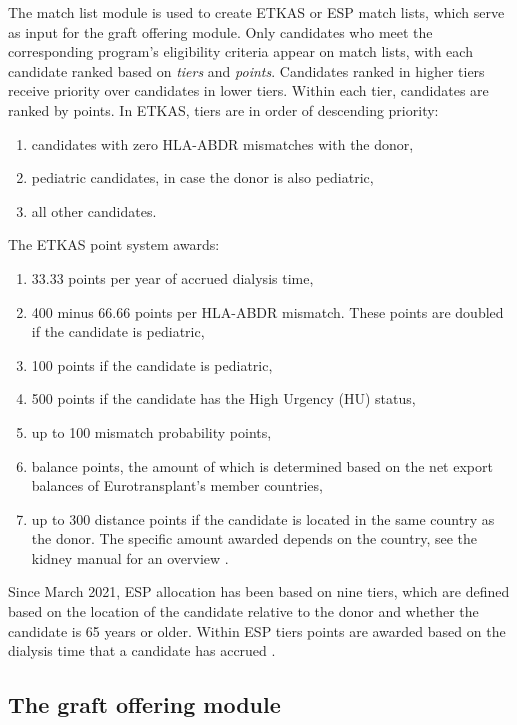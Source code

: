 \documentclass[11pt,twoside,]{book}
\begin{document}
The match list module is used to create ETKAS or ESP match lists, which
serve as input for the graft offering module. Only candidates who meet
the corresponding program's eligibility criteria appear on match lists,
with each candidate ranked based on \emph{tiers} and \emph{points}. Candidates
ranked in higher tiers receive priority over candidates in
lower tiers. Within each tier, candidates are ranked by points. In ETKAS,
tiers are in order of descending priority:

\begin{enumerate}
\def\labelenumi{\arabic{enumi}.}
\item
  candidates with zero HLA-ABDR mismatches with the donor,
\item
  pediatric candidates, in case the donor is also pediatric,
\item
  all other candidates.
\end{enumerate}

The ETKAS point system awards:

\begin{enumerate}
\def\labelenumi{\arabic{enumi}.}
\item
  33.33 points per year of accrued dialysis time,
\item
  400 minus 66.66 points per HLA-ABDR mismatch. These points are
  doubled if the candidate is pediatric,
\item
  100 points if the candidate is pediatric,
\item
  500 points if the candidate has the High Urgency (HU) status,
\item
  up to 100 mismatch probability points,
\item
  balance points, the amount of which is determined based on the net export balances of
  Eurotransplant's member countries,
\item
  up to 300 distance points if the candidate is located in the same
  country as the donor. The specific amount awarded depends on the
  country, see the kidney manual for an overview \citep{manualKidney}.
\end{enumerate}

Since March 2021, ESP allocation has been based on nine tiers, which are defined
based on the location of the candidate relative to the donor and whether the
candidate is 65 years or older. Within ESP tiers points are awarded
based on the dialysis time that a candidate has accrued \citep{manualKidney}.

\subsection{The graft offering module}\label{sec:etkidneyacceptance}
\end{document}
